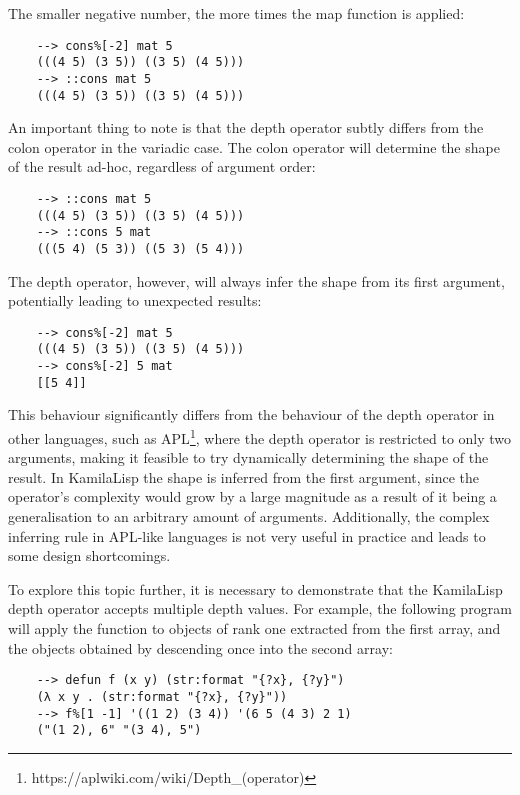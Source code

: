 The smaller negative number, the more times the map function is applied:

\begin{Verbatim}
    --> cons%[-2] mat 5
    (((4 5) (3 5)) ((3 5) (4 5)))
    --> ::cons mat 5
    (((4 5) (3 5)) ((3 5) (4 5)))
\end{Verbatim}

An important thing to note is that the depth operator subtly differs from the colon operator in the variadic case. The colon operator will determine the shape of the result ad-hoc, regardless of argument order:

\begin{Verbatim}
    --> ::cons mat 5
    (((4 5) (3 5)) ((3 5) (4 5)))
    --> ::cons 5 mat
    (((5 4) (5 3)) ((5 3) (5 4)))
\end{Verbatim}

The depth operator, however, will always infer the shape from its first argument, potentially leading to unexpected results:

\begin{Verbatim}
    --> cons%[-2] mat 5
    (((4 5) (3 5)) ((3 5) (4 5)))
    --> cons%[-2] 5 mat
    [[5 4]]
\end{Verbatim}

This behaviour significantly differs from the behaviour of the depth operator in other languages, such as APL\footnote{https://aplwiki.com/wiki/Depth\_(operator)}, where the depth operator is restricted to only two arguments, making it feasible to try dynamically determining the shape of the result. In KamilaLisp the shape is inferred from the first argument, since the operator's complexity would grow by a large magnitude as a result of it being a generalisation to an arbitrary amount of arguments. Additionally, the complex inferring rule in APL-like languages is not very useful in practice and leads to some design shortcomings.

To explore this topic further, it is necessary to demonstrate that the KamilaLisp depth operator accepts multiple depth values. For example, the following program will apply the function to objects of rank one extracted from the first array, and the objects obtained by descending once into the second array:

\begin{Verbatim}
    --> defun f (x y) (str:format "{?x}, {?y}")
    (λ x y . (str:format "{?x}, {?y}"))
    --> f%[1 -1] '((1 2) (3 4)) '(6 5 (4 3) 2 1)
    ("(1 2), 6" "(3 4), 5")
\end{Verbatim}

